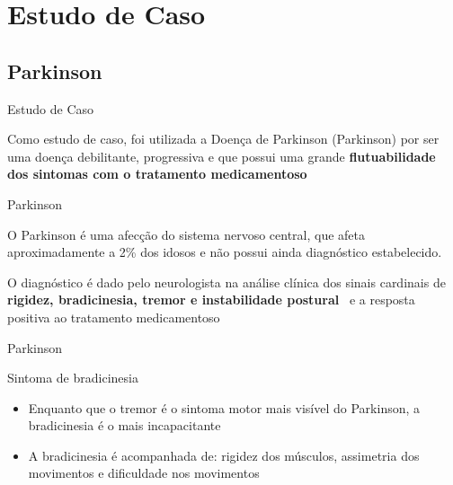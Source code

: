 \documentclass{beamer}
\begin{document}
\section{Estudo de Caso}
\subsection{Parkinson}
\begin{frame}{Estudo de Caso}
  \begin{block}{}
   Como estudo de caso, foi utilizada a Doença de Parkinson (Parkinson) por ser uma doença debilitante, progressiva e que possui uma grande \textbf{flutuabilidade dos sintomas com o tratamento medicamentoso}
  \end{block}
\end{frame}


\begin{frame}{Parkinson}
  \begin{block}{}
    O Parkinson é uma afecção do sistema nervoso central, que afeta aproximadamente a 2\% dos idosos e não possui ainda diagnóstico estabelecido. 
		
		O diagnóstico é dado pelo neurologista na análise clínica dos sinais cardinais de \textbf{rigidez, bradicinesia, tremor e instabilidade postural}~\cite{jankovic2008} e a resposta positiva ao tratamento medicamentoso~\cite{protpar010}
   \end{block}
\end{frame}


\begin{frame}{Parkinson}
  \begin{block}{Sintoma de bradicinesia}
      \begin{itemize}
	\item Enquanto que o tremor é o sintoma motor mais visível do Parkinson, a bradicinesia é o mais incapacitante
	\item A bradicinesia é acompanhada de: rigidez dos músculos, assimetria dos movimentos e dificuldade nos movimentos
	\end{itemize}
  \end{block}
\end{frame}
  
\end{document}
